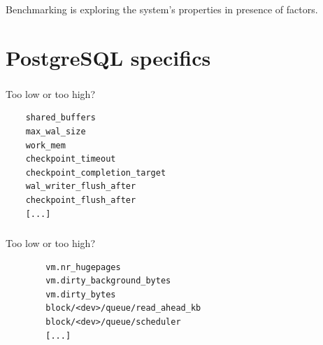\documentclass[usenames,dvipsnames, 18pt, compress, aspectratio=169]{beamer}
\begin{document}
\begin{frame}
    \frametitle{}
    \begin{center}
        Benchmarking is exploring the system's {{\bf {}}}
        properties in presence of {\bf {}} factors.

    \end{center}
\end{frame}

\section{PostgreSQL specifics}

\begin{frame}[fragile]{}
    \frametitle{}
    \begin{center}
        Too low or too high?

        \begin{verbatim}
    shared_buffers
    max_wal_size
    work_mem
    checkpoint_timeout
    checkpoint_completion_target
    wal_writer_flush_after
    checkpoint_flush_after
    [...]
        \end{verbatim}

    \end{center}
\end{frame}

\begin{frame}[fragile]{}
    \frametitle{}
    \begin{center}
        Too low or too high?

        \begin{verbatim}
        vm.nr_hugepages
        vm.dirty_background_bytes
        vm.dirty_bytes
        block/<dev>/queue/read_ahead_kb
        block/<dev>/queue/scheduler
        [...]
        \end{verbatim}
    \end{center}
\end{frame}
\end{document}
